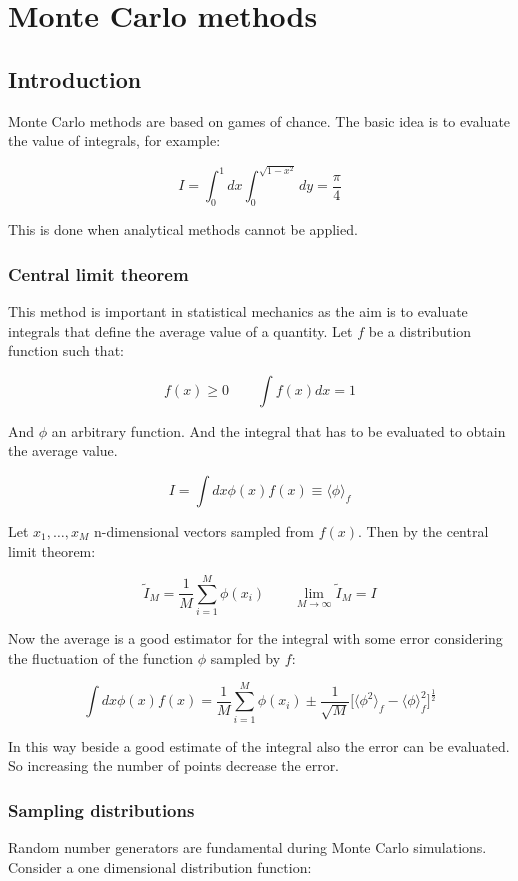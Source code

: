 \graphicspath{{chapters/17/images}}
\chapter{Monte Carlo methods}

\section{Introduction}
Monte Carlo methods are based on games of chance.
The basic idea is to evaluate the value of integrals, for example:

$$I = \int_0^1dx\int_0^{\sqrt{1-x^2}}dy = \frac{\pi}{4}$$

This is done when analytical methods cannot be applied.

	\subsection{Central limit theorem}
	This method is important in statistical mechanics as the aim is to evaluate integrals that define the average value of a quantity.
	Let $f$ be a distribution function such that:

	$$f(x)\ge 0\qquad \int f(x)dx = 1$$

	And $\phi$ an arbitrary function.
	And the integral that has to be evaluated to obtain the average value.

	$$I = \int dx\phi(x)f(x)\equiv\langle\phi\rangle_f$$

	Let $x_1, \dots, x_M$ n-dimensional vectors sampled from $f(x)$.
	Then by the central limit theorem:

	$$\tilde{I}_M = \frac{1}{M}\sum\limits_{i=1}^M\phi(x_i)\qquad \lim\limits_{M\rightarrow\infty}\tilde{I}_M = I$$

	Now the average is a good estimator for the integral with some error considering the fluctuation of the function $\phi$ sampled by $f$:

	$$\int dx\phi(x)f(x) = \frac{1}{M}\sum\limits_{i=1}^M\phi(x_i)\pm\frac{1}{\sqrt{M}}\bigl[\langle\phi^2\rangle_f-\langle\phi\rangle_f^2\bigr]^{\frac{1}{2}}$$

	In this way beside a good estimate of the integral also the error can be evaluated.
	So increasing the number of points decrease the error.

	\subsection{Sampling distributions}
	Random number generators are fundamental during Monte Carlo simulations.
	Consider a one dimensional distribution function:

